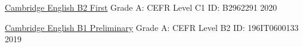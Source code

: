 

\begin{cvhonors}

  \cvhonor
    {\underline{\href{https://www.cambridgeenglish.org/exams-and-tests/first/}{Cambridge English B2 First}}} %
    {Grade A: CEFR Level C1} %
    {ID: B2962291} %
    {2020} %

  \cvhonor
    {\underline{\href{https://www.cambridgeenglish.org/exams-and-tests/preliminary/}{Cambridge English B1 Preliminary}}} %
    {Grade A: CEFR Level B2} %
    {ID: 196IT0600133} %
    {2019} %

\end{cvhonors}
